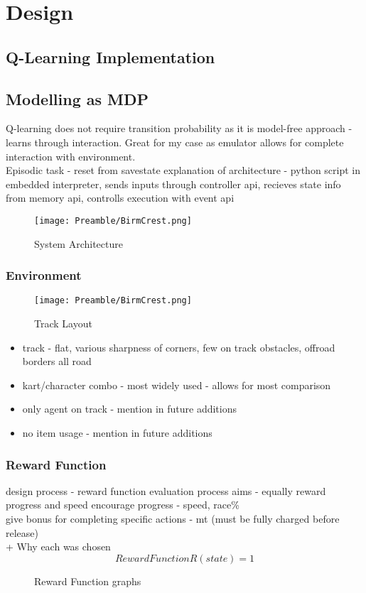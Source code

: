 \chapter{Design}

\section{Q-Learning Implementation}
\section{Modelling as MDP}
Q-learning does not require transition probability as it is model-free approach - learns through interaction. Great for my case as emulator allows for complete interaction with environment.
\\Episodic task - reset from savestate
\cite{watkins1992q}
explanation of architecture - python script in embedded interpreter, sends inputs through controller api, recieves state info from memory api, controlls execution with event api
\begin{figure}[h]
    \centering
    \texttt{[image: Preamble/BirmCrest.png]}
    \caption{System Architecture}
    \label{fig:q-learning-arch}
\end{figure}
\subsection{Environment}
\begin{figure}
    \centering
    \texttt{[image: Preamble/BirmCrest.png]}
    \caption{Track Layout}
    \label{fig:track-layout}
\end{figure}
\begin{itemize}
    \item track - flat, various sharpness of corners, few on track obstacles, offroad borders all road
    \item kart/character combo - most widely used - allows for most comparison
    \item only agent on track - mention in future additions
    \item no item usage - mention in future additions
\end{itemize}

\subsection{Reward Function}
design process - reward function evaluation process
aims - equally reward progress and speed
encourage progress - speed, race\%
\\give bonus for completing specific actions - mt (must be fully charged before release)
\\ + Why each was chosen
\[
Reward Function
R(state) = 1
\]
\begin{figure}[ht]
    \centering
    \hfill
    \caption{Reward Function graphs}
\end{figure}
